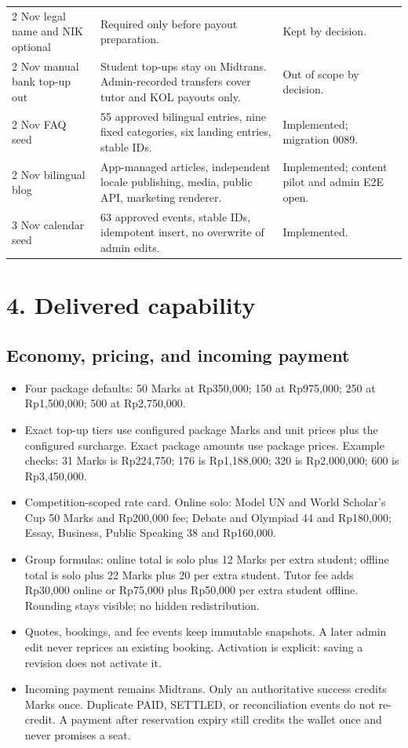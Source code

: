 \documentclass[11pt,a4paper]{article}
\begin{document}
\begin{longtable}{@{}L{3.0cm}L{8.1cm}L{4.0cm}@{}}
2 Nov legal name and NIK optional & Required only before payout preparation. & Kept by decision. \\
2 Nov manual bank top-up out & Student top-ups stay on Midtrans. Admin-recorded transfers cover tutor and KOL payouts only. & Out of scope by decision. \\
2 Nov FAQ seed & 55 approved bilingual entries, nine fixed categories, six landing entries, stable IDs. & Implemented; migration 0089. \\
2 Nov bilingual blog & App-managed articles, independent locale publishing, media, public API, marketing renderer. & Implemented; content pilot and admin E2E open. \\
3 Nov calendar seed & 63 approved events, stable IDs, idempotent insert, no overwrite of admin edits. & Implemented. \\
\bottomrule
\end{longtable}

\section{4. Delivered capability}

\subsection{Economy, pricing, and incoming payment}

\begin{itemize}
	\item Four package defaults: 50 Marks at Rp350,000; 150 at Rp975,000; 250 at Rp1,500,000; 500 at Rp2,750,000.
	\item Exact top-up tiers use configured package Marks and unit prices plus the configured surcharge. Exact package amounts use package prices. Example checks: 31 Marks is Rp224,750; 176 is Rp1,188,000; 320 is Rp2,000,000; 600 is Rp3,450,000.
	\item Competition-scoped rate card. Online solo: Model UN and World Scholar's Cup 50 Marks and Rp200,000 fee; Debate and Olympiad 44 and Rp180,000; Essay, Business, Public Speaking 38 and Rp160,000.
	\item Group formulas: online total is solo plus 12 Marks per extra student; offline total is solo plus 22 Marks plus 20 per extra student. Tutor fee adds Rp30,000 online or Rp75,000 plus Rp50,000 per extra student offline. Rounding stays visible; no hidden redistribution.
	\item Quotes, bookings, and fee events keep immutable snapshots. A later admin edit never reprices an existing booking. Activation is explicit: saving a revision does not activate it.
	\item Incoming payment remains Midtrans. Only an authoritative success credits Marks once. Duplicate PAID, SETTLED, or reconciliation events do not re-credit. A payment after reservation expiry still credits the wallet once and never promises a seat.
\end{itemize}
\end{document}
